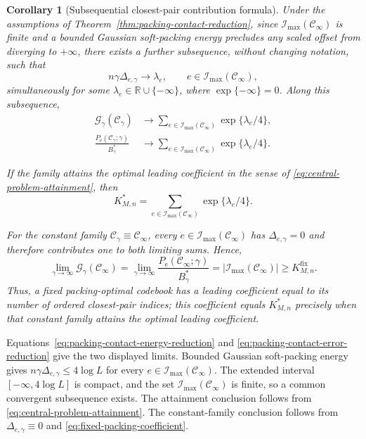 \documentclass[12pt,draftclsnofoot,onecolumn]{IEEEtran}
\newcommand{\R}{\mathbb{R}}
\newcommand{\cC}{\mathcal{C}}
\newcommand{\cG}{\mathcal{G}}
\newcommand{\cI}{\mathcal{I}}
\newcommand{\Pe}{P_{\mathrm e}}
\newtheorem{corollary}{Corollary}
\theoremstyle{definition}
\begin{document}
\begin{corollary}[Subsequential closest-pair contribution formula]
\label{cor:subsequential-weighted-contact}
Under the assumptions of
Theorem~\ref{thm:packing-contact-reduction}, since
\(\cI_{\max}(\cC_\infty)\) is finite and a bounded Gaussian soft-packing energy
precludes any scaled offset from diverging to \(+\infty\), there exists
a further subsequence, without changing notation, such that
\begin{equation}
  n\gamma\Delta_{e,\gamma}\longrightarrow\lambda_e,
  \qquad
  e\in\cI_{\max}(\cC_\infty),
  \label{eq:weighted-contact-lambda-limit}
\end{equation}
simultaneously for some
\(\lambda_e\in\R\cup\{-\infty\}\), where
\(\exp\{-\infty\}=0\).  Along this subsequence,
\begin{align}
  \cG_\gamma(\cC_\gamma)
  &\longrightarrow
  \sum_{e\in\cI_{\max}(\cC_\infty)}
  \exp\{\lambda_e/4\},
  \label{eq:weighted-contact-energy-limit}\\
  \frac{\Pe(\cC_\gamma;\gamma)}{B_\gamma^{\ast}}
  &\longrightarrow
  \sum_{e\in\cI_{\max}(\cC_\infty)}
  \exp\{\lambda_e/4\}.
  \label{eq:weighted-contact-error-limit}
\end{align}

If the family attains the optimal leading coefficient in the sense of
\eqref{eq:central-problem-attainment},
then
\[
  K^{\ast}_{M,n}
  =
  \sum_{e\in\cI_{\max}(\cC_\infty)}
  \exp\{\lambda_e/4\}.
\]

For the constant family
\(\cC_\gamma\equiv\cC_\infty\), every
\(e\in\cI_{\max}(\cC_\infty)\) has \(\Delta_{e,\gamma}=0\) and
therefore contributes one to both limiting sums.  Hence,
\[
  \lim_{\gamma\to\infty}\cG_\gamma(\cC_\infty)
  =
  \lim_{\gamma\to\infty}
  \frac{\Pe(\cC_\infty;\gamma)}{B_\gamma^{\ast}}
  =
  \bigl|\cI_{\max}(\cC_\infty)\bigr|
  \geq K^{\mathrm{fix}}_{M,n}.
\]
Thus, a fixed packing-optimal codebook has a leading coefficient equal to
its number of ordered closest-pair indices; this coefficient equals
\(K^{\ast}_{M,n}\) precisely when that constant family attains the optimal
leading coefficient.
\end{corollary}

\begin{IEEEproof}
Equations~\eqref{eq:packing-contact-energy-reduction} and
\eqref{eq:packing-contact-error-reduction} give the two displayed
limits.  Bounded Gaussian soft-packing energy gives
\(n\gamma\Delta_{e,\gamma}\le4\log L\) for every
\(e\in\cI_{\max}(\cC_\infty)\).
The extended interval \([{-\infty},4\log L]\) is compact, and the
set \(\cI_{\max}(\cC_\infty)\) is finite, so a common convergent
subsequence exists.  The attainment conclusion follows from
\eqref{eq:central-problem-attainment}.  The constant-family conclusion
follows from \(\Delta_{e,\gamma}\equiv0\) and
\eqref{eq:fixed-packing-coefficient}.
\end{IEEEproof}
\end{document}

